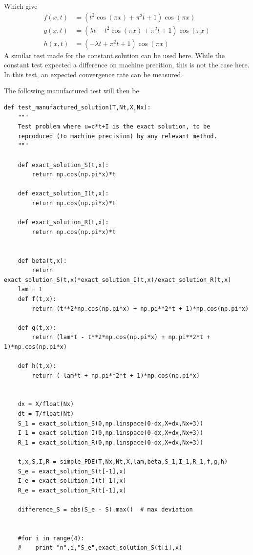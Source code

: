 \documentclass[%
twoside,                 %
final,                   %
10pt]{article}
\begin{document}
Which give
\begin{equation} \label{eq:manu_func}
	\begin{aligned}
	f(x,t) &= (t^2\cos(\pi x) + \pi^2t + 1)\cos(\pi x)\\
	g(x,t) &= (\lambda t - t^2\cos(\pi x) + \pi^2t + 1)\cos(\pi x)\\
	h(x,t) &= (-\lambda t + \pi^2t + 1)\cos(\pi x)
	\end{aligned}
\end{equation}
A similar test made for the constant solution can be used here. While the constant test expected a difference on machine precition, this is not the case here. In this test, an expected convergence rate can be measured.

The following manufactured test will then be
\begin{Verbatim}[numbers=none,fontsize=\fontsize{9pt}{9pt},baselinestretch=0.95]
def test_manufactured_solution(T,Nt,X,Nx):
    """
    Test problem where u=c*t+I is the exact solution, to be
    reproduced (to machine precision) by any relevant method.
    """
    
    def exact_solution_S(t,x):
        return np.cos(np.pi*x)*t

    def exact_solution_I(t,x):
        return np.cos(np.pi*x)*t

    def exact_solution_R(t,x):
        return np.cos(np.pi*x)*t


    def beta(t,x):
        return exact_solution_S(t,x)*exact_solution_I(t,x)/exact_solution_R(t,x)
    lam = 1
    def f(t,x):
        return (t**2*np.cos(np.pi*x) + np.pi**2*t + 1)*np.cos(np.pi*x) 

    def g(t,x):
        return (lam*t - t**2*np.cos(np.pi*x) + np.pi**2*t + 1)*np.cos(np.pi*x)

    def h(t,x):
        return (-lam*t + np.pi**2*t + 1)*np.cos(np.pi*x)
        

    dx = X/float(Nx)
    dt = T/float(Nt)
    S_1 = exact_solution_S(0,np.linspace(0-dx,X+dx,Nx+3))
    I_1 = exact_solution_I(0,np.linspace(0-dx,X+dx,Nx+3))
    R_1 = exact_solution_R(0,np.linspace(0-dx,X+dx,Nx+3))
     
    t,x,S,I,R = simple_PDE(T,Nx,Nt,X,lam,beta,S_1,I_1,R_1,f,g,h)
    S_e = exact_solution_S(t[-1],x)
    I_e = exact_solution_I(t[-1],x)
    R_e = exact_solution_R(t[-1],x)
    
    difference_S = abs(S_e - S).max()  # max deviation

    
    #for i in range(4):
    #    print "n",i,"S_e",exact_solution_S(t[i],x)
    

\end{Verbatim}
\end{document}
